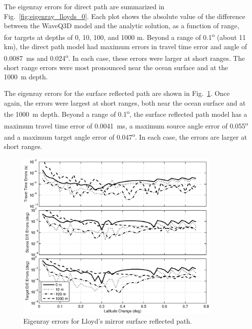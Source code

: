 \documentclass{ws-jca}
\begin{document}
The eigenray errors for direct path are summarized in
Fig.~\ref{fig:eigenray_lloyds_0}. Each plot shows the absolute value of the
difference between the WaveQ3D model and the analytic solution, as a
function of range, for targets at depths of 0, 10, 100, and 1000 m. Beyond
a range of 0.1\textsuperscript{o} (about 11 km), the direct path model had
maximum errors in travel time error and angle of 0.0087~ms and
0.024\textsuperscript{o}. In each case, these errors were larger at short
ranges. The short range errors were most pronounced near the ocean surface
and at the 1000~m depth.

The eigenray errors for the surface reflected path are shown in
Fig.~\ref{fig:eigenray_lloyds_1}. Once again, the errors were largest at
short ranges, both near the ocean surface and at the 1000~m depth. Beyond a range of
0.1\textsuperscript{o}, the surface reflected path model has a maximum
travel time error of 0.0041~ms, a maximum source angle
error of 0.055\textsuperscript{o} and a maximum target angle error of
0.047\textsuperscript{o}. In each case, the errors are larger at short
ranges.
\begin{figure}[th]
	\centerline{\includegraphics[width=4in]{eigenray_lloyds_1.eps}} 
	\vspace*{8pt}
	\caption{Eigenray errors for Lloyd's mirror surface reflected path.
	\label{fig:eigenray_lloyds_1}}
\end{figure}
\end{document}
